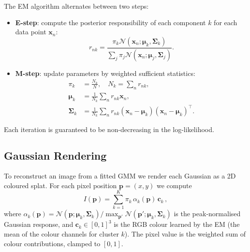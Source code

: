 \documentclass[a4paper,conference]{IEEEtran}
\begin{document}
The EM algorithm alternates between two steps:
\begin{itemize}
  \item \textbf{E-step}: compute the posterior responsibility of each component
        $k$ for each data point $\mathbf{x}_n$:
        \begin{equation}
          r_{nk} = \frac{\pi_k \mathcal{N}(\mathbf{x}_n;\boldsymbol{\mu}_k,\boldsymbol{\Sigma}_k)}
                        {\sum_{j}\pi_j \mathcal{N}(\mathbf{x}_n;\boldsymbol{\mu}_j,\boldsymbol{\Sigma}_j)}.
          \label{eq:estep}
        \end{equation}
  \item \textbf{M-step}: update parameters by weighted sufficient statistics:
        \begin{align}
          \pi_k &= \frac{N_k}{N}, \quad N_k = \sum_n r_{nk}, \label{eq:mstep_pi}\\
          \boldsymbol{\mu}_k &= \frac{1}{N_k}\sum_n r_{nk}\mathbf{x}_n, \label{eq:mstep_mu}\\
          \boldsymbol{\Sigma}_k &= \frac{1}{N_k}\sum_n r_{nk}(\mathbf{x}_n - \boldsymbol{\mu}_k)(\mathbf{x}_n - \boldsymbol{\mu}_k)^\top. \label{eq:mstep_sigma}
        \end{align}
\end{itemize}
Each iteration is guaranteed to be non-decreasing in the log-likelihood.

\subsection{Gaussian Rendering}
\label{subsec:rendering}

To reconstruct an image from a fitted GMM we render each Gaussian as a
2D coloured splat.  For each pixel position $\mathbf{p}=(x,y)$ we compute
\begin{equation}
  I(\mathbf{p}) = \sum_{k=1}^{K} \pi_k \, \alpha_k(\mathbf{p}) \, \mathbf{c}_k \,,
  \label{eq:render}
\end{equation}
where $\alpha_k(\mathbf{p}) = \mathcal{N}(\mathbf{p};\boldsymbol{\mu}_k,\boldsymbol{\Sigma}_k) / \max_{\mathbf{p}'}\mathcal{N}(\mathbf{p}';\boldsymbol{\mu}_k,\boldsymbol{\Sigma}_k)$
is the peak-normalised Gaussian response, and $\mathbf{c}_k \in [0,1]^3$ is the
RGB colour learned by the EM (the mean of the colour channels for cluster $k$).
The pixel value is the weighted sum of colour contributions, clamped to $[0,1]$.
\end{document}
